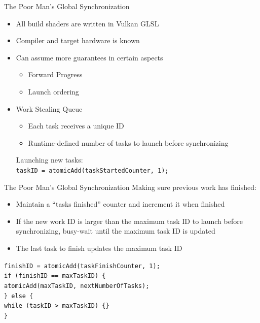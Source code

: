 \documentclass[aspectratio=169,t]{beamer}
\begin{document}
\begin{slide}{The Poor Man's Global Synchronization}
  \begin{itemize}
   \item All build shaders are written in Vulkan GLSL
   \item Compiler and target hardware is known
   \item Can assume more guarantees in certain aspects
   \begin{itemize}
    \item Forward Progress
    \item Launch ordering
   \end{itemize}
   \item Work Stealing Queue
   \begin{itemize}
    \item Each task receives a unique ID
    \item Runtime-defined number of tasks to launch before synchronizing
   \end{itemize}
   Launching new tasks:\\
   \pause
   \texttt{taskID = atomicAdd(taskStartedCounter, 1);}\\
  \end{itemize}
\end{slide}

\begin{slide}{The Poor Man's Global Synchronization}
   Making sure previous work has finished:\\
  \begin{itemize}
   \item Maintain a ``tasks finished'' counter and increment it when finished
   \item If the new work ID is larger than the maximum task ID to launch before synchronizing, busy-wait until the maximum task ID is updated
   \item The last task to finish updates the maximum task ID
  \end{itemize}

  \texttt{finishID = atomicAdd(taskFinishCounter, 1);\\
  if (finishID == maxTaskID) \{\\
  \hspace*{8pt}atomicAdd(maxTaskID, nextNumberOfTasks);\\
  \}
  else \{\\
  \hspace*{8pt}while (taskID > maxTaskID) \{\}\\
  \}
  }\\
\end{slide}
\end{document}
